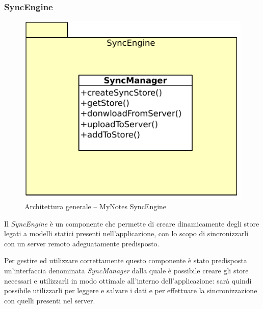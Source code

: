 \subsubsection{SyncEngine}
\begin{figure}[htb]
\centering
\includegraphics[scale=0.6]{gfx/class/SyncEngine.pdf}
\caption{Architettura generale -- MyNotes SyncEngine}
\label{fig:architettura MyNotes SyncEngine}
\end{figure}
Il \emph{SyncEngine} è un componente che permette di creare dinamicamente degli store legati a modelli statici presenti nell'applicazione, con lo scopo di sincronizzarli con un server remoto adeguatamente predisposto.

Per gestire ed utilizzare correttamente questo componente è stato predisposta un'interfaccia denominata \emph{SyncManager} dalla quale è possibile creare gli store necessari e utilizzarli in modo ottimale all'interno dell'applicazione: sarà quindi possibile utilizzarli per leggere e salvare i dati e per effettuare la sincronizzazione con quelli presenti nel server.

